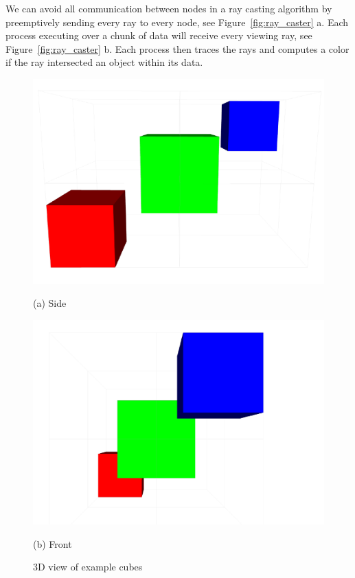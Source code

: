 We can avoid all communication between nodes in a ray casting algorithm by 
preemptively sending every ray to every node, see Figure~\ref{fig:ray_caster} a.  
Each process executing over a chunk of data will receive every viewing ray, see 
Figure~\ref{fig:ray_caster} b.  Each process then traces the rays and computes a
color if the ray intersected an object within its data.  

\begin{figure}[!htb]
  \includegraphics[width=\linewidth]{drawings/side.pdf}
  
(a) Side

\endminipage\hfill
{}
  \includegraphics[width=\linewidth]{drawings/front.pdf}
  
(b) Front

\endminipage\hfill
\caption{3D view of example cubes}
\label{fig:cubes_3d}
\end{figure}

